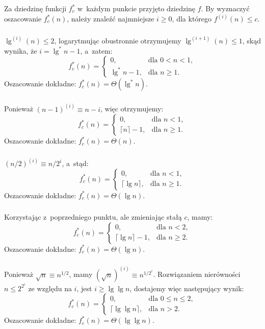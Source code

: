 Za dziedzinę funkcji $f_c^*$ w~każdym punkcie przyjęto dziedzinę $f$. By wyznaczyć oszacowanie $f_c^*(n)$, należy znaleźć najmniejsze $i\ge 0$, dla którego $f^{(i)}(n)\le c$.

\subsubsection{} %
$\lg^{(i)}(n)\le 2$, logarytmując obustronnie otrzymujemy $\lg^{(i+1)}(n)\le 1$, skąd wynika, że $i=\lg^*n-1$, a~zatem:
\[
	f_c^*(n)=\left\{\begin{array}{ll}
		0, & \mbox{dla }0<n<1, \\
		\lg^*n-1, & \mbox{dla }n\ge 1.
	\end{array}\right.
\]
Oszacowanie dokładne: $f_c^*(n)=\Theta(\lg^* n)$.

\subsubsection{} %
Ponieważ $(n-1)^{(i)}\equiv n-i$, więc otrzymujemy:
\[
	f_c^*(n)=\left\{\begin{array}{ll}
		0, & \mbox{dla }n<1, \\
		\lceil n\rceil-1, & \mbox{dla }n\ge 1.
	\end{array}\right.
\]
Oszacowanie dokładne: $f_c^*(n)=\Theta(n)$.

\subsubsection{} %
$(n/2)^{(i)}\equiv n/2^i$, a~stąd:
\[
	f_c^*(n)=\left\{\begin{array}{ll}
		0, & \mbox{dla }n<1, \\
		\lceil\lg n\rceil, & \mbox{dla }n\ge 1.
	\end{array}\right.
\]
Oszacowanie dokładne: $f_c^*(n)=\Theta(\lg n)$.

\subsubsection{} %
Korzystając z~poprzedniego punktu, ale zmieniając stałą $c$, mamy:
\[
	f_c^*(n)=\left\{\begin{array}{ll}
		0, & \mbox{dla }n<2, \\
		\lceil\lg n\rceil-1, & \mbox{dla }n\ge 2.
	\end{array}\right.
\]
Oszacowanie dokładne: $f_c^*(n)=\Theta(\lg n)$.

\subsubsection{} %
Ponieważ $\sqrt{n}\equiv n^{1/2}$, mamy $\left(\sqrt{n}\right)^{(i)}\equiv n^{1/2^i}$. Rozwiązaniem nierówności $n\le 2^{2^i}$ ze względu na $i$, jest $i\ge\lg\lg n$, dostajemy więc następujący wynik:
\[
	f_c^*(n)=\left\{\begin{array}{ll}
		0, & \mbox{dla }0\le n\le 2, \\
		\lceil\lg\lg n\rceil, & \mbox{dla }n>2.
	\end{array}\right.
\]
Oszacowanie dokładne: $f_c^*(n)=\Theta(\lg\lg n)$.

